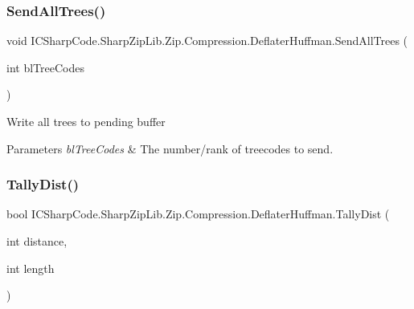 \subsubsection{\texorpdfstring{Send\+All\+Trees()}{SendAllTrees()}\hspace{0.1cm}{\footnotesize\ttfamily [2/2]}}
{\footnotesize\ttfamily void I\+C\+Sharp\+Code.\+Sharp\+Zip\+Lib.\+Zip.\+Compression.\+Deflater\+Huffman.\+Send\+All\+Trees (\begin{DoxyParamCaption}\item[{int}]{bl\+Tree\+Codes }\end{DoxyParamCaption})\hspace{0.3cm}{\ttfamily [inline]}}



Write all trees to pending buffer 


\begin{DoxyParams}{Parameters}
{\em bl\+Tree\+Codes} & The number/rank of treecodes to send.\\
\hline
\end{DoxyParams}
\mbox{\label{class_i_c_sharp_code_1_1_sharp_zip_lib_1_1_zip_1_1_compression_1_1_deflater_huffman_ac8edc6b7ea91fd984bd5d40a5839a692}} 
\subsubsection{\texorpdfstring{Tally\+Dist()}{TallyDist()}\hspace{0.1cm}{\footnotesize\ttfamily [1/2]}}
{\footnotesize\ttfamily bool I\+C\+Sharp\+Code.\+Sharp\+Zip\+Lib.\+Zip.\+Compression.\+Deflater\+Huffman.\+Tally\+Dist (\begin{DoxyParamCaption}\item[{int}]{distance,  }\item[{int}]{length }\end{DoxyParamCaption})\hspace{0.3cm}{\ttfamily [inline]}}



